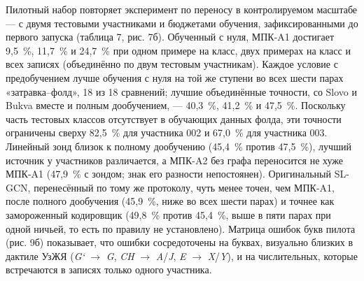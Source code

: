 \documentclass[a4paper,fleqn]{cas-dc}
\begin{document}
Пилотный набор повторяет эксперимент по переносу в контролируемом масштабе --- с двумя тестовыми участниками и бюджетами обучения, зафиксированными до первого запуска (таблица 7, рис. 7б). Обученный с нуля, МПК-A1 достигает 9,5~\%, 11,7~\% и 24,7~\% при одном примере на класс, двух примерах на класс и всех записях (объединённо по двум тестовым участникам). Каждое условие с предобучением лучше обучения с нуля на той же ступени во всех шести парах «затравка--фолд», 18 из 18 сравнений; лучшие объединённые точности, со Slovo и Bukva вместе и полным дообучением, --- 40,3~\%, 41,2~\% и 47,5~\%. Поскольку часть тестовых классов отсутствует в обучающих данных фолда, эти точности ограничены сверху 82,5~\% для участника 002 и 67,0~\% для участника 003. Линейный зонд близок к полному дообучению (45,4~\% против 47,5~\%), лучший источник у участников различается, а МПК-A2 без графа переносится не хуже МПК-A1 (47,9~\% с зондом; знак его разности непостоянен). Оригинальный SL-GCN, перенесённый по тому же протоколу, чуть менее точен, чем МПК-A1, после полного дообучения (45,9~\%, ниже во всех шести парах) и точнее как замороженный кодировщик (49,8~\% против 45,4~\%, выше в пяти парах при одной ничьей, то есть по правилу не установлено). Матрица ошибок букв пилота (рис. 9б) показывает, что ошибки сосредоточены на буквах, визуально близких в дактиле УзЖЯ (\emph{G‘} $\rightarrow$ \emph{G}, \emph{CH} $\rightarrow$ \emph{A}/\emph{J}, \emph{E} $\rightarrow$ \emph{X}/\emph{Y}), и на числительных, которые встречаются в записях только одного участника.
\end{document}

